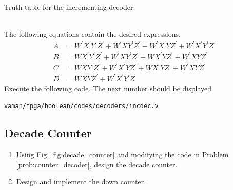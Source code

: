\documentclass[journal,12pt,twocolumn]{IEEEtran}
\renewcommand\thesection{\arabic{section}}
\renewcommand\thesubsection{\thesection.\arabic{subsection}}
\begin{document}
\begin{enumerate}[label=\thesubsection.\arabic*.,ref=\thesubsection.\theenumi]
\label{prob:counter_decoder}
\begin{table}
\centering

\caption{Truth table for the incrementing decoder.}
\label{tab:vaman/fpga/boolean/counter_decoder}
\end{table}
\\
\solution The following equations contain the desired expressions.
\begin{align}
\label{eq:vaman/fpga/boolean/inc_A}
A &= W^{\prime}X^{\prime}Y^{\prime}Z^{\prime} + W^{\prime}XY^{\prime}Z^{\prime}
+W^{\prime}X^{\prime}YZ^{\prime}
+W^{\prime}X^{\prime}Y^{\prime}Z
\\
\label{eq:vaman/fpga/boolean/inc_B}
B &= WX^{\prime}Y^{\prime}Z^{\prime} + W^{\prime}XY^{\prime}Z^{\prime}
+WX^{\prime}YZ^{\prime}
+W^{\prime}XYZ^{\prime}
\\
\label{eq:vaman/fpga/boolean/inc_C}
C &= WXY^{\prime}Z^{\prime} + W^{\prime}X^{\prime}YZ^{\prime}
+WX^{\prime}YZ^{\prime}
+W^{\prime}XYZ^{\prime}
\\
D &= WXYZ^{\prime} + W^{\prime}X^{\prime}Y^{\prime}Z
\label{eq:vaman/fpga/boolean/inc_D}
\end{align}
Execute the following code.  The next number should be displayed.
\begin{lstlisting}
vaman/fpga/boolean/codes/decoders/incdec.v
\end{lstlisting}
\end{enumerate}
%
\subsection{Decade Counter}
\renewcommand{\theequation}{\theenumi}
\renewcommand{\thefigure}{\theenumi}
\begin{enumerate}[label=\thesubsection.\arabic*.,ref=\thesubsection.\theenumi]

\item Using Fig. \ref{fig:decade_counter} and modifying the code in Problem \ref{prob:counter_decoder}, design the decade counter.
%
\item Design and implement the down counter.
\end{enumerate}
%
\end{document}
